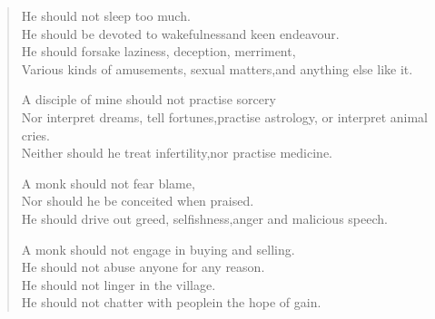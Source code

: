 \begin{verse}
 He should not sleep too much.\\
He should be devoted to wakefulness\newline and keen endeavour.\\
He should forsake laziness, deception, merriment,\\
Various kinds of amusements, sexual matters,\newline and anything else like it.

\clearpage


 A disciple of mine should not practise sorcery\\
Nor interpret dreams, tell fortunes,\newline practise astrology, or interpret animal cries.\\
Neither should he treat infertility,\newline nor practise medicine.


 A monk should not fear blame,\\
Nor should he be conceited when praised.\\
He should drive out greed, selfishness,\newline anger and malicious speech.


 A monk should not engage in buying and selling.\\
He should not abuse anyone for any reason.\\
He should not linger in the village.\\
He should not chatter with people\newline in the hope of gain.



\end{verse}
